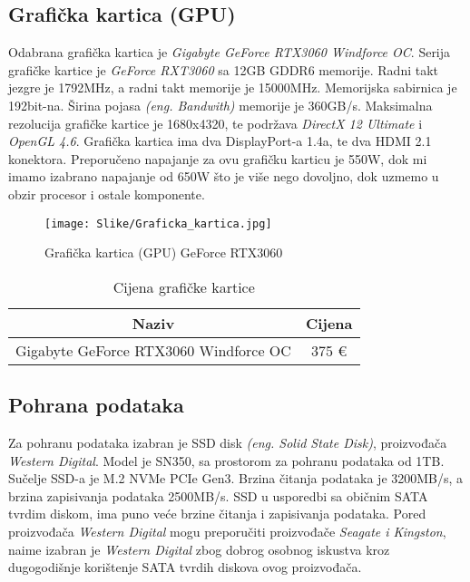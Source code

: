\documentclass{article}
\begin{document}
    \clearpage
    \subsection{Grafička kartica (GPU)}
    Odabrana grafička kartica je \textit{Gigabyte GeForce RTX3060 Windforce OC}. Serija grafičke kartice je \textit{GeForce RXT3060} sa 12GB GDDR6 memorije. Radni takt jezgre je 1792MHz, a radni takt memorije je 15000MHz. Memorijska sabirnica je 192bit-na. Širina pojasa \emph{(eng. Bandwith)} memorije je 360GB/s. Maksimalna rezolucija grafičke kartice je 1680x4320, te podržava \textit{DirectX 12 Ultimate} i \textit{OpenGL 4.6}. Grafička kartica ima dva DisplayPort-a 1.4a, te dva HDMI 2.1 konektora. Preporučeno napajanje za ovu grafičku karticu je 550W, dok mi imamo izabrano napajanje od 650W što je više nego dovoljno, dok uzmemo u obzir procesor i ostale komponente.

    \begin{figure}[H]
        \centering
        \texttt{[image: Slike/Graficka\_kartica.jpg]}
        \caption{Grafička kartica (GPU) GeForce RTX3060}
        \label{fig:Graficka}
    \end{figure}

    \begin{table}[H]
        \centering
        \begin{tabular}{|c|c|}
            \hline
            Naziv & Cijena \\
            \hline
            Gigabyte GeForce RTX3060 Windforce OC & 375 € \\
            \hline
        \end{tabular}
        \caption{Cijena grafičke kartice}
        \label{tab:Graficka}
    \end{table}

    \clearpage
    \subsection{Pohrana podataka}
    Za pohranu podataka izabran je SSD disk \emph{(eng. Solid State Disk)}, proizvođača \textit{Western Digital}. Model je SN350, sa prostorom za pohranu podataka od 1TB. Sučelje SSD-a je M.2 NVMe PCIe Gen3. Brzina čitanja podataka je 3200MB/s, a brzina zapisivanja podataka 2500MB/s. SSD u usporedbi sa običnim SATA tvrdim diskom, ima puno veće brzine čitanja i zapisivanja podataka. Pored proizvođača \textit{Western Digital} mogu preporučiti proizvođače \textit{Seagate i Kingston}, naime izabran je \textit{Western Digital} zbog dobrog osobnog iskustva kroz dugogodišnje korištenje SATA tvrdih diskova ovog proizvođača.
\end{document}

